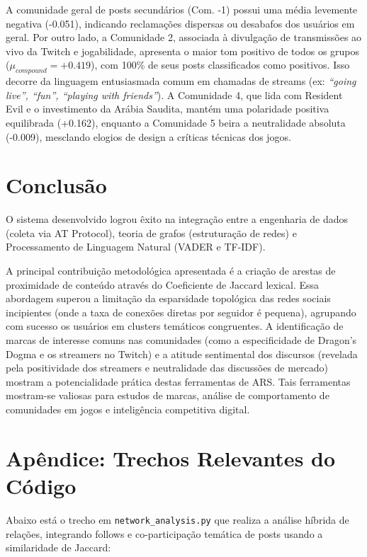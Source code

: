 \documentclass[12pt,a4paper]{article}
\begin{document}
A comunidade geral de posts secundários (Com. -1) possui uma média levemente negativa (-0.051), indicando reclamações dispersas ou desabafos dos usuários em geral. Por outro lado, a Comunidade 2, associada à divulgação de transmissões ao vivo da Twitch e jogabilidade, apresenta o maior tom positivo de todos os grupos ($\mu_{compound} = +0.419$), com 100\% de seus posts classificados como positivos. Isso decorre da linguagem entusiasmada comum em chamadas de streams (ex: \textit{``going live'', ``fun'', ``playing with friends''}). A Comunidade 4, que lida com Resident Evil e o investimento da Arábia Saudita, mantém uma polaridade positiva equilibrada (+0.162), enquanto a Comunidade 5 beira a neutralidade absoluta (-0.009), mesclando elogios de design a críticas técnicas dos jogos.

\section{Conclusão}
O sistema desenvolvido logrou êxito na integração entre a engenharia de dados (coleta via AT Protocol), teoria de grafos (estruturação de redes) e Processamento de Linguagem Natural (VADER e TF-IDF). 

A principal contribuição metodológica apresentada é a criação de arestas de proximidade de conteúdo através do Coeficiente de Jaccard lexical. Essa abordagem superou a limitação da esparsidade topológica das redes sociais incipientes (onde a taxa de conexões diretas por seguidor é pequena), agrupando com sucesso os usuários em clusters temáticos congruentes. A identificação de marcas de interesse comuns nas comunidades (como a especificidade de Dragon's Dogma e os streamers no Twitch) e a atitude sentimental dos discursos (revelada pela positividade dos streamers e neutralidade das discussões de mercado) mostram a potencialidade prática destas ferramentas de ARS. Tais ferramentas mostram-se valiosas para estudos de marcas, análise de comportamento de comunidades em jogos e inteligência competitiva digital.

\newpage
\section*{Apêndice: Trechos Relevantes do Código}

Abaixo está o trecho em \texttt{network\_analysis.py} que realiza a análise híbrida de relações, integrando follows e co-participação temática de posts usando a similaridade de Jaccard:
\end{document}
